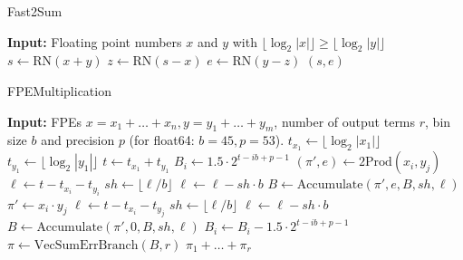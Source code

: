 \begin{algorithm}
    \caption{Fast2Sum}\label{alg:fast2sum}
    \begin{algorithmic}[1]
        \STATE \textbf{Input:} Floating point numbers $x$ and $y$ with $\lfloor \log_2 |x| \rfloor \geq \lfloor \log_2 |y| \rfloor$
        \STATE $s \gets \text{RN}(x + y)$
        \STATE $z \gets \text{RN}(s - x)$
        \STATE $e \gets \text{RN}(y - z)$
        \RETURN $(s, e)$
    \end{algorithmic}
\end{algorithm}


\begin{algorithm}
    \caption{FPEMultiplication}\label{alg:fpe_mult}
    \begin{algorithmic}[1]
        \STATE \textbf{Input:} FPEs $x = x_1 + \ldots + x_n, y = y_1 + \ldots + y_m$, number of output terms $r$, bin size $b$ and precision $p$ (for float64: $b = 45, p = 53$).
        \STATE $t_{x_1} \gets \lfloor \log_2 |x_1| \rfloor$
        \STATE $t_{y_1} \gets \lfloor \log_2 |y_1| \rfloor$
        \STATE $t \gets t_{x_1} + t_{y_1}$
            \STATE $B_i \gets 1.5 \cdot 2^{t - ib + p - 1}$
        \ENDFOR
                \STATE $(\pi', e) \gets \text{2Prod}(x_i, y_j)$
                \STATE $\ell \gets t - t_{x_i} - t_{y_i}$
                \STATE $sh \gets \lfloor \ell / b \rfloor$
                \STATE $\ell \gets \ell - sh \cdot b$
                \STATE $B \gets \text{Accumulate}(\pi', e, B, sh, \ell)$
            \ENDFOR
                \STATE $\pi' \gets x_i \cdot y_j$
                \STATE $\ell \gets t - t_{x_i} - t_{y_j}$
                \STATE $sh \gets \lfloor \ell / b \rfloor$
                \STATE $\ell \gets \ell - sh \cdot b$
                \STATE $B \gets \text{Accumulate}(\pi', 0, B, sh, \ell)$
            \ENDIF
        \ENDFOR
            \STATE $B_i \gets B_i - 1.5 \cdot 2^{t - ib + p - 1}$
        \ENDFOR
        \STATE $\pi \gets \text{VecSumErrBranch}(B, r)$
        \RETURN $\pi_1 + \ldots + \pi_r$
    \end{algorithmic}
\end{algorithm}

